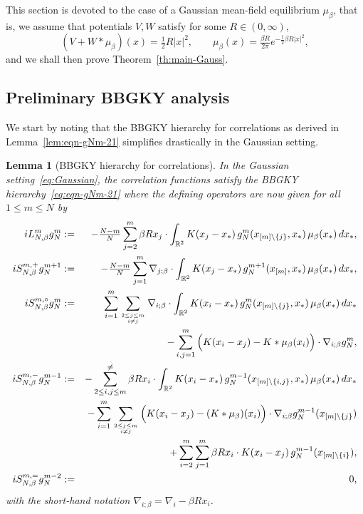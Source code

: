 \documentclass[a4paper,11pt,reqno,noindent]{amsart}
\theoremstyle{plain}
\newtheorem{lem}{Lemma}[section]
\numberwithin{equation}{section}
\newcommand{\R}{\mathbb R}
\newcommand{\3}{|\!|\!|}
\begin{document}
This section is devoted to the case of a Gaussian mean-field equilibrium $\mu_\beta$, that is, we assume that potentials $V,W$ satisfy for some $R\in(0,\infty)$,
\begin{equation}\label{eq:Gaussian}
(V+W\ast\mu_\beta)(x)=\tfrac12R|x|^2,\qquad\mu_\beta(x)=\tfrac{\beta R}{2\pi}e^{-\frac12\beta R|x|^2},
\end{equation}
and we shall then prove Theorem~\ref{th:main-Gauss}.

\subsection{Preliminary BBGKY analysis}
We start by noting that the BBGKY hierarchy for correlations as derived in Lemma~\ref{lem:eqn-gNm-21} simplifies drastically in the Gaussian setting.

\begin{lem}[BBGKY hierarchy for correlations]\label{lem:eqn-gNm-21-G}
In the Gaussian setting~\eqref{eq:Gaussian},
the correlation functions satisfy the BBGKY hierarchy~\eqref{eq:eqn-gNm-21}
where the defining operators are now given for all $1\le m\le N$ by
\begingroup\allowdisplaybreaks
\begin{eqnarray*}
iL_{N,\beta}^mg_N^m&:=&-\tfrac{N-m}N\sum_{j=2}^m\beta Rx_j\cdot\int_{\R^2} K(x_j-x_*)\,g_N^{m}(x_{[m]\setminus\{j\}},x_*)\,\mu_\beta(x_*)\,dx_*,\\
iS_{N,\beta}^{m,+}g_N^{m+1}&:=&-\tfrac{N-m}N\sum_{j=1}^m\nabla_{j;\beta}\cdot \int_{\R^2} K(x_j-x_*)\,g_N^{m+1}(x_{[m]},x_*)\,\mu_\beta(x_*)\,dx_*,\\
iS_{N,\beta}^{m,\circ}g_N^{m}&:=&\sum_{i=1}^m\sum_{2\le j\le m\atop i\ne j}\nabla_{i;\beta}\cdot\int_{\R^2}K(x_i-x_*)\,g_N^{m}(x_{[m]\setminus\{j\}},x_*)\,\mu_\beta(x_*)\,dx_*\\
&&-\sum_{i,j=1}^m\Big(K(x_i-x_j)-K\ast\mu_\beta(x_i)\Big)\cdot\nabla_{i;\beta}g_N^m,\\
iS_{N,\beta}^{m,-}g_N^{m-1}&:=&-\sum_{2\le i,j\le m}^{\ne}\beta Rx_i\cdot\int_{\R^2} K(x_i-x_*)\,g_N^{m-1}(x_{[m]\setminus\{i,j\}},x_*)\,\mu_\beta(x_*)\,dx_*\\
&&-\sum_{i=1}^m\sum_{2\le j\le m\atop i\ne j}\Big(K(x_i-x_j)-(K\ast\mu_\beta)(x_i)\Big)\cdot\nabla_{i;\beta}g_N^{m-1}(x_{[m]\setminus\{j\}})\\
&&+\sum_{i=2}^m\sum_{j=1}^m\beta Rx_i\cdot K(x_i-x_j)\,g_N^{m-1}(x_{[m]\setminus\{i\}}),\\
iS_{N,\beta}^{m,=}g_N^{m-2}&:=&0,
\end{eqnarray*}
\endgroup
with the short-hand notation $\nabla_{i;\beta}=\nabla_i-\beta Rx_i$.
\end{lem}
\end{document}
